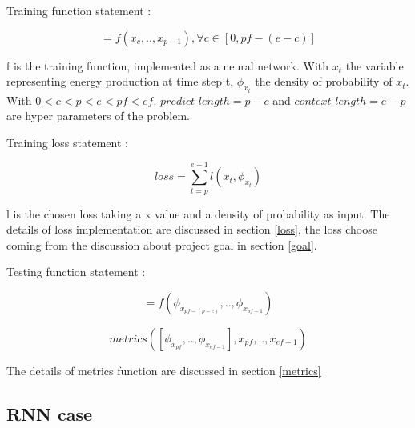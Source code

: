 \documentclass[a4paper, 12pt]{article}
\begin{document}
Training function statement : 

\begin{equation}
    [\phi_{x_p},..,\phi_{x_{e-1}}] = f({x_c},..,{x_{p-1}}), \forall c \in [0, pf-(e-c)]
\end{equation}

f is the training function, implemented as a neural network.
With $x_t$ the variable representing energy production at time step t, $\phi_{x_t}$  the density of probability of $x_t$. With $0<c<p<e<pf<ef$. 
$predict\_length = p-c$ and $context\_length = e-p$ are hyper parameters of the problem. 

Training loss statement :


\begin{equation}
    loss = \sum^{e-1}_{t=p}l(x_t,\phi_{x_t})
\end{equation}

l is the chosen loss taking a x value and a density of probability as input.
The details of loss implementation are discussed in section \ref{loss}, the loss choose coming from
the discussion about project goal in section \ref{goal}.

Testing function statement :

\begin{equation}
    [\phi_{x_{pf}},..,\phi_{x_{ef-1}}] = f(\phi_{x_{pf-(p-c)}},..,\phi_{x_{pf-1}})
\end{equation}

\begin{equation}
    metrics([\phi_{x_{pf}},..,\phi_{x_{ef-1}}],{x_{pf}},..,{x_{ef-1}})
\end{equation}

The details of metrics function are discussed in section \ref{metrics}

\subsection{RNN case}

\begin{center}
\end{center}
\end{document}
